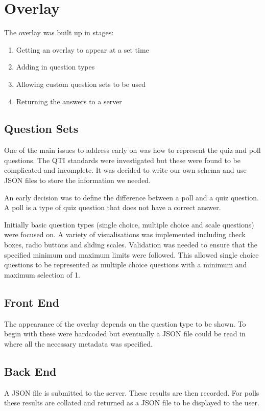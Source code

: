 \chapter{Overlay} \label{Chapter:Overlay}
The overlay was built up in stages:
\begin{enumerate}
\item Getting an overlay to appear at a set time
\item Adding in question types
\item Allowing custom question sets to be used
\item Returning the answers to a server
\end{enumerate}
\section{Question Sets} 
\label{Section:Question sets}
One of the main issues to address early on was how to represent the quiz and poll questions. The QTI standards were investigated but these were found to be complicated and incomplete. It was decided to write our own schema and use JSON files to store the information we needed. 

An early decision was to define the difference between a poll and a quiz question. A poll is a type of quiz question that does not have a correct answer.

Initially basic question types (single choice, multiple choice and scale questions) were focused on. A variety of visualisations was implemented including check boxes, radio buttons and sliding scales. Validation was needed to ensure that the specified minimum and maximum limits were followed. This allowed single choice questions to be represented as multiple choice questions with a minimum and maximum selection of 1.
\section{Front End} 
\label{Section:Front end}
The appearance of the overlay depends on the question type to be shown. To begin with these were hardcoded but eventually a JSON file could be read in where all the necessary metadata was specified.
\section{Back End} 
\label{Section:Back end}
A JSON file is submitted to the server. These results are then recorded. For polls these results are collated and returned as a JSON file to be displayed to the user.
